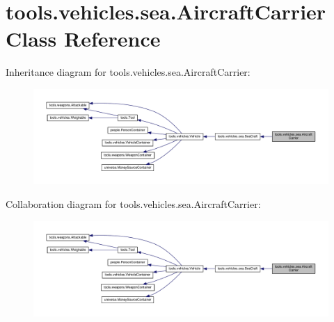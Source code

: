 \hypertarget{classtools_1_1vehicles_1_1sea_1_1_aircraft_carrier}{}\section{tools.\+vehicles.\+sea.\+Aircraft\+Carrier Class Reference}
\label{classtools_1_1vehicles_1_1sea_1_1_aircraft_carrier}


Inheritance diagram for tools.\+vehicles.\+sea.\+Aircraft\+Carrier\+:
\nopagebreak
\begin{figure}[H]
\begin{center}
\leavevmode
\includegraphics[width=350pt]{classtools_1_1vehicles_1_1sea_1_1_aircraft_carrier__inherit__graph}
\end{center}
\end{figure}


Collaboration diagram for tools.\+vehicles.\+sea.\+Aircraft\+Carrier\+:
\nopagebreak
\begin{figure}[H]
\begin{center}
\leavevmode
\includegraphics[width=350pt]{classtools_1_1vehicles_1_1sea_1_1_aircraft_carrier__coll__graph}
\end{center}
\end{figure}
